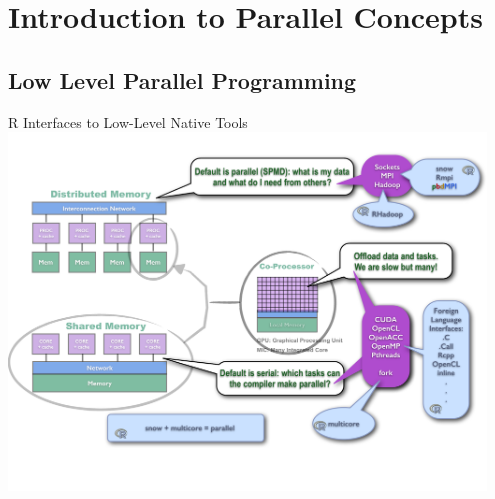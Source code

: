 \section{Introduction to Parallel Concepts}
\makesubcontentsslides



\subsection{Low Level Parallel Programming}
\makesubcontentsslidessec

\begin{frame}{R Interfaces to Low-Level Native Tools}
\includegraphics[width=0.95\textwidth]
{../common/pics/hardware/ParallelHardware10.pdf}
\end{frame}
